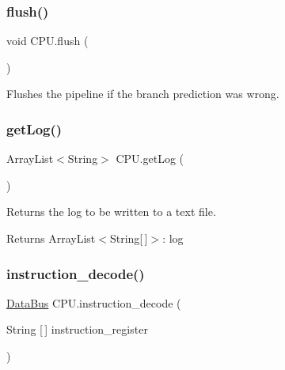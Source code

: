 \subsubsection{\texorpdfstring{flush()}{flush()}}
{\footnotesize\ttfamily void C\+P\+U.\+flush (\begin{DoxyParamCaption}{ }\end{DoxyParamCaption})\hspace{0.3cm}{\ttfamily [private]}}

Flushes the pipeline if the branch prediction was wrong. \mbox{\label{class_c_p_u_a594b92f9f813ab337f27eff0ec9bd0c5}} 
\subsubsection{\texorpdfstring{get\+Log()}{getLog()}}
{\footnotesize\ttfamily Array\+List$<$String$>$ C\+P\+U.\+get\+Log (\begin{DoxyParamCaption}{ }\end{DoxyParamCaption})\hspace{0.3cm}{\ttfamily [package]}}

Returns the log to be written to a text file. \begin{DoxyReturn}{Returns}
Array\+List$<$\+String\mbox{[}$\,$\mbox{]}$>$\+: log 
\end{DoxyReturn}
\mbox{\label{class_c_p_u_aa2f0a271b5c6137569fe9c206388bdcc}} 
\subsubsection{\texorpdfstring{instruction\+\_\+decode()}{instruction\_decode()}}
{\footnotesize\ttfamily \mbox{\hyperlink{class_data_bus}{Data\+Bus}} C\+P\+U.\+instruction\+\_\+decode (\begin{DoxyParamCaption}\item[{String \mbox{[}$\,$\mbox{]}}]{instruction\+\_\+register }\end{DoxyParamCaption})\hspace{0.3cm}{\ttfamily [private]}}

\mbox{\label{class_c_p_u_a23d225d9e85ee08b1084782d2702f62e}} 
